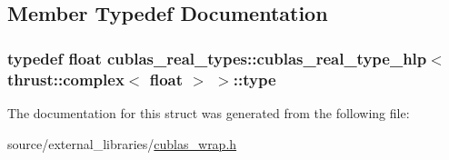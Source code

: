 \subsection{Member Typedef Documentation}
\hypertarget{structcublas__real__types_1_1cublas__real__type__hlp_3_01thrust_1_1complex_3_01float_01_4_01_4_a4df7173816b8077f524b4eabfafdc50d}{
\subsubsection[{type}]{\setlength{\rightskip}{0pt plus 5cm}typedef float {\bf cublas\-\_\-real\-\_\-types\-::cublas\-\_\-real\-\_\-type\-\_\-hlp}$<$ {\bf thrust\-::complex}$<$ float $>$ $>$\-::{\bf type}}}\label{structcublas__real__types_1_1cublas__real__type__hlp_3_01thrust_1_1complex_3_01float_01_4_01_4_a4df7173816b8077f524b4eabfafdc50d}


The documentation for this struct was generated from the following file\-:\begin{DoxyCompactItemize}
\item 
source/external\-\_\-libraries/\hyperlink{cublas__wrap_8h}{cublas\-\_\-wrap.\-h}\end{DoxyCompactItemize}
